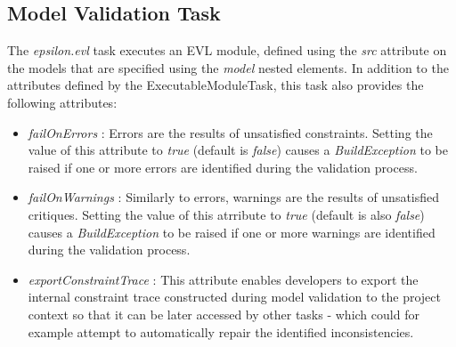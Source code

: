 \subsection{Model Validation Task}
\label{sec:EvlTask}

The \emph{epsilon.evl} task executes an EVL module, defined using the \emph{src} attribute on the models that are specified using the \emph{model} nested elements. In addition to the attributes defined by the ExecutableModuleTask, this task also provides the following attributes:

\begin{itemize}
	\item \emph{failOnErrors} : Errors are the results of unsatisfied constraints. Setting the value of this attribute to \emph{true} (default is \emph{false}) causes a \emph{BuildException} to be raised if one or more errors are identified during the validation process.
	\item \emph{failOnWarnings} : Similarly to errors, warnings are the results of unsatisfied critiques. Setting the value of this atrribute to \emph{true} (default is also \emph{false}) causes a \emph{BuildException} to be raised if one or more warnings are identified during the validation process.
	\item \emph{exportConstraintTrace} : This attribute enables developers to export the internal constraint trace constructed during model validation to the project context so that it can be later accessed by other tasks - which could for example attempt to automatically repair the identified inconsistencies. 
\end{itemize}

